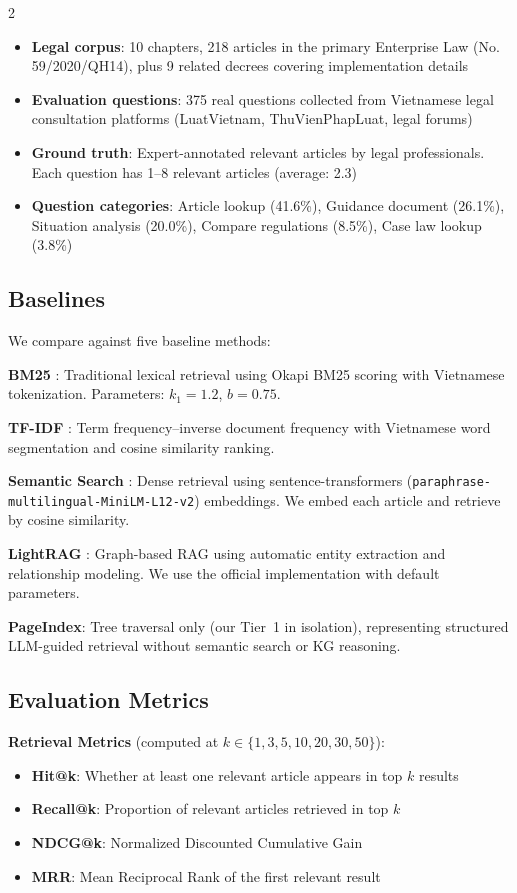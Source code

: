 \documentclass[11pt,a4paper]{article}
\begin{document}
\begin{multicols}{2}
\begin{itemize}
\item \textbf{Legal corpus}: 10 chapters, 218 articles in the primary Enterprise Law (No. 59/2020/QH14), plus 9 related decrees covering implementation details
\item \textbf{Evaluation questions}: 375 real questions collected from Vietnamese legal consultation platforms (LuatVietnam, ThuVienPhapLuat, legal forums)
\item \textbf{Ground truth}: Expert-annotated relevant articles by legal professionals. Each question has 1--8 relevant articles (average: 2.3)
\item \textbf{Question categories}: Article lookup (41.6\%), Guidance document (26.1\%), Situation analysis (20.0\%), Compare regulations (8.5\%), Case law lookup (3.8\%)
\end{itemize}

\subsection{Baselines}

We compare against five baseline methods:

\textbf{BM25} \cite{ref1}: Traditional lexical retrieval using Okapi BM25 scoring with Vietnamese tokenization. Parameters: $k_1=1.2$, $b=0.75$.

\textbf{TF-IDF} \cite{ref11}: Term frequency--inverse document frequency with Vietnamese word segmentation and cosine similarity ranking.

\textbf{Semantic Search} \cite{ref_sbert}: Dense retrieval using sentence-transformers (\texttt{paraphrase-multilingual-\allowbreak{}MiniLM-L12-v2}) embeddings. We embed each article and retrieve by cosine similarity.

\textbf{LightRAG} \cite{ref5}: Graph-based RAG using automatic entity extraction and relationship modeling. We use the official implementation with default parameters.

\textbf{PageIndex}: Tree traversal only (our Tier~1 in isolation), representing structured LLM-guided retrieval without semantic search or KG reasoning.

\subsection{Evaluation Metrics}

\textbf{Retrieval Metrics} (computed at $k \in \{1,3,5,10,20,30,50\}$):
\begin{itemize}
\item \textbf{Hit@k}: Whether at least one relevant article appears in top $k$ results
\item \textbf{Recall@k}: Proportion of relevant articles retrieved in top $k$
\item \textbf{NDCG@k}: Normalized Discounted Cumulative Gain
\item \textbf{MRR}: Mean Reciprocal Rank of the first relevant result
\end{itemize}


\end{multicols}
\end{document}
